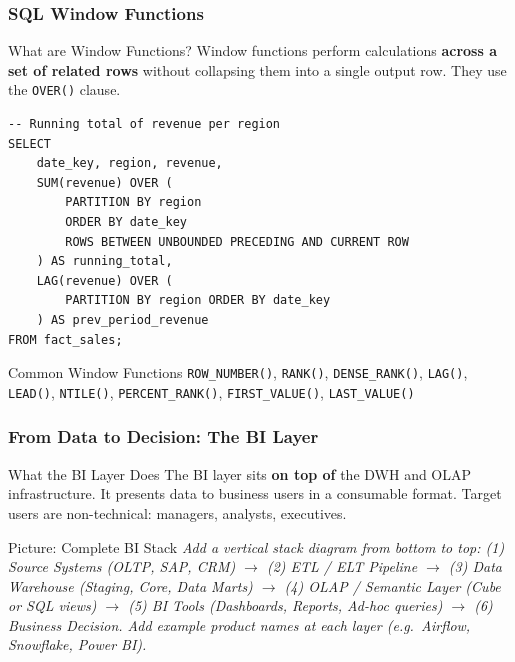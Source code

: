 \begin{frame}[fragile]
  \frametitle{SQL Window Functions}

  \begin{block}{What are Window Functions?}
    Window functions perform calculations \textbf{across a set of related rows}
    without collapsing them into a single output row.
    They use the \texttt{OVER()} clause.
  \end{block}

  \begin{lstlisting}[style=sqlstyle]
-- Running total of revenue per region
SELECT
    date_key, region, revenue,
    SUM(revenue) OVER (
        PARTITION BY region
        ORDER BY date_key
        ROWS BETWEEN UNBOUNDED PRECEDING AND CURRENT ROW
    ) AS running_total,
    LAG(revenue) OVER (
        PARTITION BY region ORDER BY date_key
    ) AS prev_period_revenue
FROM fact_sales;
  \end{lstlisting}

  \begin{block}{Common Window Functions}
    \texttt{ROW\_NUMBER()}, \texttt{RANK()}, \texttt{DENSE\_RANK()},
    \texttt{LAG()}, \texttt{LEAD()}, \texttt{NTILE()},
    \texttt{PERCENT\_RANK()}, \texttt{FIRST\_VALUE()}, \texttt{LAST\_VALUE()}
  \end{block}
\end{frame}


\begin{frame}
  \frametitle{From Data to Decision: The BI Layer}

  \begin{block}{What the BI Layer Does}
    The BI layer sits \textbf{on top of} the DWH and OLAP infrastructure.
    It presents data to business users in a consumable format.
    Target users are non-technical: managers, analysts, executives.
  \end{block}

  \begin{alertblock}{Picture: Complete BI Stack}
    \textit{Add a vertical stack diagram from bottom to top:
    (1) Source Systems (OLTP, SAP, CRM)
    $\to$ (2) ETL / ELT Pipeline
    $\to$ (3) Data Warehouse (Staging, Core, Data Marts)
    $\to$ (4) OLAP / Semantic Layer (Cube or SQL views)
    $\to$ (5) BI Tools (Dashboards, Reports, Ad-hoc queries)
    $\to$ (6) Business Decision.
    Add example product names at each layer (e.g.\ Airflow, Snowflake, Power BI).}
  \end{alertblock}
\end{frame}

